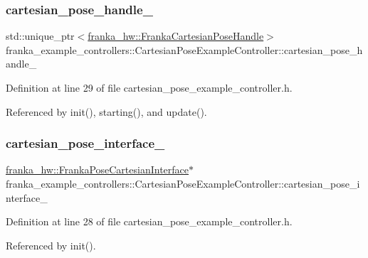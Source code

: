 \subsubsection{\texorpdfstring{cartesian\+\_\+pose\+\_\+handle\+\_\+}{cartesian\_pose\_handle\_}}
{\footnotesize\ttfamily std\+::unique\+\_\+ptr$<$\hyperlink{classfranka__hw_1_1FrankaCartesianPoseHandle}{franka\+\_\+hw\+::\+Franka\+Cartesian\+Pose\+Handle}$>$ franka\+\_\+example\+\_\+controllers\+::\+Cartesian\+Pose\+Example\+Controller\+::cartesian\+\_\+pose\+\_\+handle\+\_\+\hspace{0.3cm}{\ttfamily [private]}}



Definition at line 29 of file cartesian\+\_\+pose\+\_\+example\+\_\+controller.\+h.



Referenced by init(), starting(), and update().

\mbox{\label{classfranka__example__controllers_1_1CartesianPoseExampleController_a19b9c7a7046c8e94d9bbd877f2e5f113}} 
\subsubsection{\texorpdfstring{cartesian\+\_\+pose\+\_\+interface\+\_\+}{cartesian\_pose\_interface\_}}
{\footnotesize\ttfamily \hyperlink{classfranka__hw_1_1FrankaPoseCartesianInterface}{franka\+\_\+hw\+::\+Franka\+Pose\+Cartesian\+Interface}$\ast$ franka\+\_\+example\+\_\+controllers\+::\+Cartesian\+Pose\+Example\+Controller\+::cartesian\+\_\+pose\+\_\+interface\+\_\+\hspace{0.3cm}{\ttfamily [private]}}



Definition at line 28 of file cartesian\+\_\+pose\+\_\+example\+\_\+controller.\+h.



Referenced by init().

